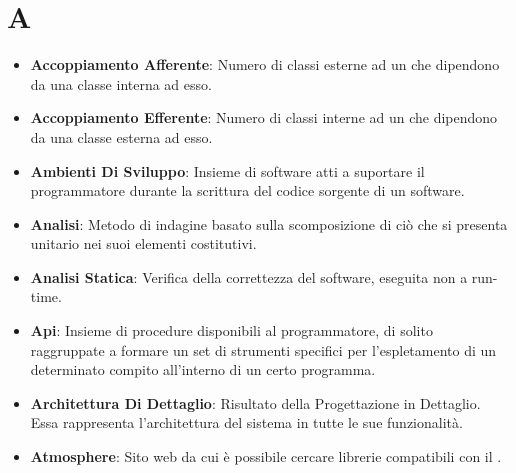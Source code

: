 \section*{A}
\begin{itemize}
	\item
	\textbf{Accoppiamento Afferente}: Numero di classi esterne ad un  che dipendono da una classe interna ad esso.
	\item
	\textbf{Accoppiamento Efferente}: Numero di classi interne ad un  che dipendono da una classe esterna ad esso.
	\item
	\textbf{Ambienti Di Sviluppo}: Insieme di software atti a suportare il programmatore durante la scrittura del codice sorgente di un software.
	\item
	\textbf{Analisi}: Metodo di indagine basato sulla scomposizione di ciò che si presenta unitario nei suoi elementi costitutivi.
	\item
	\textbf{Analisi Statica}: Verifica della correttezza del software, eseguita non a run-time.
	\item
	\textbf{Api}: Insieme di procedure disponibili al programmatore, di solito raggruppate a formare un set di strumenti specifici per l'espletamento di un determinato compito all'interno di un certo programma.
	\item
	\textbf{Architettura Di Dettaglio}: Risultato della Progettazione in Dettaglio. Essa rappresenta l'architettura del sistema in tutte le sue funzionalità.
	\item
	\textbf{Atmosphere}: Sito web da cui è possibile cercare librerie compatibili con il  .
\end{itemize}
\newpage